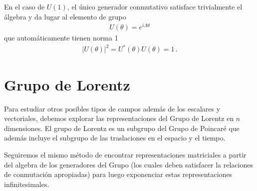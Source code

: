 En el caso de $U(1)$, el único generador conmutativo satisface trivialmente el álgebra y da lugar al elemento de grupo
\begin{align}
  U(\theta)=e^{i\Lambda \theta}
\end{align}
que automáticamente tienen norma 1
\begin{align*}
|U(\theta)|^2= U^{*}(\theta)U(\theta)=1\,.
\end{align*}


\section{Grupo de Lorentz }
Para estudiar otros posibles tipos de campos además de los escalares y vectoriales, debemos explorar las representaciones del Grupo de Lorentz en $n$ dimensiones. El grupo de Lorentz es un subgrupo del Grupo de Poincaré que además incluye el subgrupo de las traslaciones en el espacio y el tiempo.

Seguiremos el mismo método de encontrar representaciones matriciales a partir del algebra  de los generadores del Grupo (los cuales deben satisfacer la relaciones de conmutación apropiadas) para luego exponenciar estas representaciones infinitesimales.

